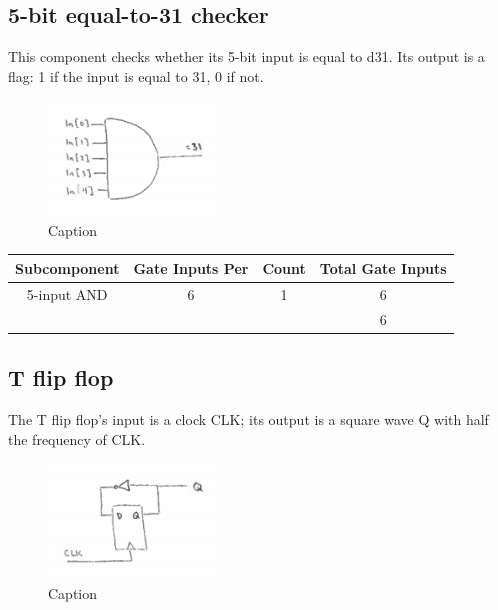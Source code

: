 \documentclass{article}
\begin{document}
\newpage

\subsection{5-bit equal-to-31 checker}
This component checks whether its 5-bit input is equal to d31. Its output is a flag: 1 if the input is equal to 31, 0 if not. \\

\begin{figure}[!ht]
\centering
\includegraphics[width=0.4\textwidth]{img/eq31}
\caption{Caption}
\label{fig:eq31}
\end{figure}

\begin{center}
\begin{tabular}{ ccc|c }
 \textbf{Subcomponent} & \textbf{Gate Inputs Per} & \textbf{Count} & \textbf{Total Gate Inputs} \\
 \hline
 5-input AND & 6 & 1 & 6 \\
 \hline
 &&& 6\\
\end{tabular}
\end{center}

\subsection{T flip flop}
The T flip flop's input is a clock CLK; its output is a square wave Q with half the frequency of CLK. \\

\begin{figure}[!ht]
\centering
\includegraphics[width=0.4\textwidth]{img/tff}
\caption{Caption}
\label{fig:tff}
\end{figure}
\end{document}
